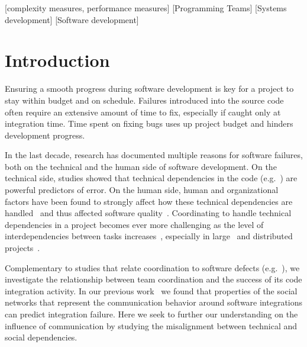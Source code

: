 \documentclass{sig-alternate}
\begin{document}
[complexity measures, \linebreak performance measures]
[Programming Teams]
[Systems development]
[Software development]



\section{Introduction}


Ensuring a smooth progress during software development is key for a project to
stay within budget and on schedule. Failures introduced into the source code
often require an extensive amount of time to fix, especially if caught only at
integration time. Time spent on fixing bugs uses up project budget and
hinders development progress.

In the last decade, research has documented %
multiple reasons for software failures, both on the technical and the human side of
software development. 
On the technical side, studies showed that technical dependencies in the code (e.g.~\cite{zimmermann:icse:2008,gall:icsm:1998}) are powerful predictors of error. 
On the human side, human and organizational factors have been found to strongly affect how
these technical dependencies are handled~\cite{souza:cscw:2004,herbsleb:icse:1999}
 and thus affected %
 software quality~\cite{cataldo:tse:2009,herbsleb:icis:2006}.
Coordinating to handle technical dependencies in a project becomes ever more challenging as the level of
interdependencies between tasks increases~\cite{galbraith:book:1973}, especially in large~\cite{curtis:acm:1988} and distributed projects~\cite{damian:icgse:2007,herbsleb:icse:1999}. 

Complementary to studies that relate coordination to software
defects (e.g.~\cite{cataldo:tse:2009}), we investigate
the relationship between team coordination and the success of its code
integration activity. In our previous work~\cite{wolf:icse:2009} we found that
properties of the social networks that represent the communication behavior
around software integrations can predict integration failure.
Here we seek to further our understanding on the influence of communication by
studying the misalignment between technical and social dependencies.
\end{document}
